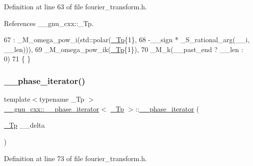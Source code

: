 Definition at line 63 of file fourier\+\_\+transform.\+h.



References \+\_\+\+\_\+gnu\+\_\+cxx\+::\+\_\+\+Tp.


\begin{DoxyCode}
67       : \_M\_omega\_pow\_i(std::polar(\hyperlink{namespace____gnu__cxx_a3b19a9c800ca194374ef9172290f7d79}{\_Tp}\{1\},
68                                   -\_\_sign * \_S\_rational\_arg(\_\_i, \_\_len))),
69         \_M\_omega\_pow\_ik(\hyperlink{namespace____gnu__cxx_a3b19a9c800ca194374ef9172290f7d79}{\_Tp}\{1\}),
70         \_M\_k(\_\_past\_end ? \_\_len : 0)
71       \{ \}
\end{DoxyCode}
\mbox{\label{class____gnu__cxx_1_1____phase__iterator_af8e0ad92d27e66a746106603aafe9115}} 
\subsubsection{\texorpdfstring{\+\_\+\+\_\+phase\+\_\+iterator()}{\_\_phase\_iterator()}\hspace{0.1cm}{\footnotesize\ttfamily [2/2]}}
{\footnotesize\ttfamily template$<$typename \+\_\+\+Tp $>$ \\
\hyperlink{class____gnu__cxx_1_1____phase__iterator}{\+\_\+\+\_\+gnu\+\_\+cxx\+::\+\_\+\+\_\+phase\+\_\+iterator}$<$ \hyperlink{namespace____gnu__cxx_a3b19a9c800ca194374ef9172290f7d79}{\+\_\+\+Tp} $>$\+::\hyperlink{class____gnu__cxx_1_1____phase__iterator}{\+\_\+\+\_\+phase\+\_\+iterator} (\begin{DoxyParamCaption}\item[{\hyperlink{namespace____gnu__cxx_a3b19a9c800ca194374ef9172290f7d79}{\+\_\+\+Tp}}]{\+\_\+\+\_\+delta }\end{DoxyParamCaption})\hspace{0.3cm}{\ttfamily [inline]}}



Definition at line 73 of file fourier\+\_\+transform.\+h.



